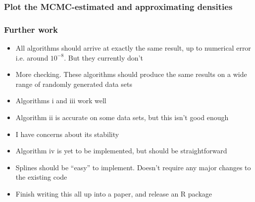 \documentclass{beamer}
\begin{document}
\begin{frame}
\frametitle{Plot the MCMC-estimated and approximating densities}
\end{frame}

\begin{frame}
\frametitle{Further work}
\begin{itemize}
\item All algorithms should arrive at exactly the same result, up to numerical error i.e. around $10^{-8}$. But they currently don't
\item More checking. These algorithms should produce the same results on
a wide range of randomly generated data sets
\item Algorithms i and iii work well
\item Algorithm ii is accurate on some data sets, but this isn't good enough
\item I have concerns about its stability
\item Algorithm iv is yet to be implemented, but should be straightforward
\item Splines should be ``easy'' to implement. Doesn't require any major changes to the existing code
\item Finish writing this all up into a paper, and release an R package
\end{itemize}
\end{frame}
\end{document}
